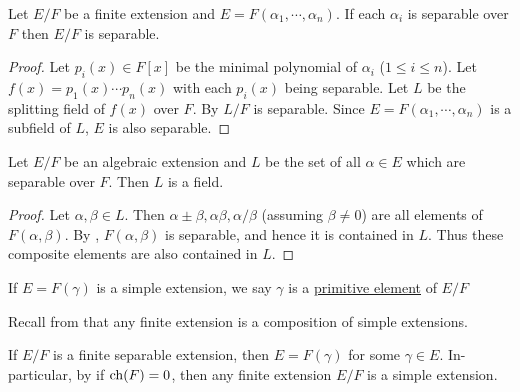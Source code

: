 \documentclass[11pt]{article}
\begin{document}
\begin{corollary}
    Let $E/F$ be a finite extension and $E=F(\alpha_1,\cdots,\alpha_n)$. If each $\alpha_i$ is separable over $F$ then $E/F$ is separable.
\end{corollary}

\begin{proof}
    Let $p_i(x)\in F[x]$ be the minimal polynomial of $\alpha_i$ ($1\leq i\leq n$). Let $f(x)=p_1(x)\cdots p_n(x)$ with each $p_i(x)$ being separable. Let $L$ be the splitting field of $f(x)$ over $F$. By  $L/F$ is separable. Since $E=F(\alpha_1,\cdots,\alpha_n)$ is a subfield of $L$, $E$ is also separable.
    
\end{proof}

\begin{corollary}
    Let $E/F$ be an algebraic extension and $L$ be the set of all $\alpha\in E$ which are separable over $F$. Then $L$ is a field.
\end{corollary}

\begin{proof}
    Let $\alpha,\beta\in L$. Then $\alpha\pm\beta,\alpha\beta,\alpha/\beta$ (assuming $\beta\neq0$) are all elements of $F(\alpha,\beta)$. By , $F(\alpha,\beta)$ is separable, and hence it is contained in $L$. Thus these composite elements are also contained in $L$.
    
\end{proof}

\begin{definition}
    If $E=F(\gamma)$ is a simple extension, we say $\gamma$ is a \ul{primitive element} of $E/F$
\end{definition}

Recall from  that any finite extension is a composition of simple extensions.

\begin{theorem}
    If $E/F$ is a finite separable extension, then $E=F(\gamma)$ for some $\gamma\in E$. In-particular, by  if $\operatorname{ch}(F)=0$, then any finite extension $E/F$ is a simple extension.
\end{theorem}
\end{document}
